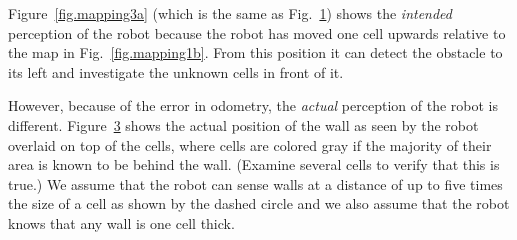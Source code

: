 \begin{figure}
\subfigures
\begin{minipage}{\textwidth}
\hspace{\fill}
\label{fig.mapping2a}
\label{fig.mapping2b}
\end{minipage}
\end{figure}

\begin{figure}
\subfigures
\begin{minipage}{\textwidth}
\hspace{\fill}
\label{fig.mapping2c}
\label{fig.mapping2d}
\end{minipage}
\end{figure}

Figure~\ref{fig.mapping3a} (which is the same as Fig.~\ref{fig.mapping2b}) shows the \emph{intended} perception of the robot because the robot has moved one cell upwards relative to the map in Fig.~\ref{fig.mapping1b}. From this position it can detect the obstacle to its left and investigate the unknown cells in front of it.

However, because of the error in odometry, the \emph{actual} perception of the robot is different. Figure~\ref{fig.mapping3b} shows the actual position of the wall as seen by the robot overlaid on top of the cells, where cells are colored gray if the majority of their area is known to be behind the wall. (Examine several cells to verify that this is true.) We assume that the robot can sense walls at a distance of up to five times the size of a cell as shown by the dashed circle and we also assume that the robot knows that any wall is one cell thick.

\begin{figure}
\subfigures
\begin{minipage}{\textwidth}
\hspace{\fill}
\label{fig.mapping3a}
\label{fig.mapping3b}
\end{minipage}
\end{figure}

